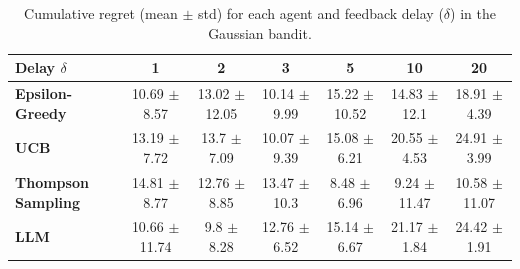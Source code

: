 \begin{table}[htbp]
\caption{Cumulative regret (mean $\pm$ std) for each agent and feedback delay ($\delta$) in the Gaussian bandit.}
\label{tab:gaussian_delays}
\begin{tabular}{lcccccc}
\toprule
Delay $\delta$ & 1 & 2 & 3 & 5 & 10 & 20 \\
\midrule
\textbf{Epsilon-Greedy} & 10.69 $\pm$ 8.57 & 13.02 $\pm$ 12.05 & 10.14 $\pm$ 9.99 & 15.22 $\pm$ 10.52 & 14.83 $\pm$ 12.1 & 18.91 $\pm$ 4.39 \\
\textbf{UCB} & 13.19 $\pm$ 7.72 & 13.7 $\pm$ 7.09 & 10.07 $\pm$ 9.39 & 15.08 $\pm$ 6.21 & 20.55 $\pm$ 4.53 & 24.91 $\pm$ 3.99 \\
\textbf{Thompson Sampling} & 14.81 $\pm$ 8.77 & 12.76 $\pm$ 8.85 & 13.47 $\pm$ 10.3 & 8.48 $\pm$ 6.96 & 9.24 $\pm$ 11.47 & 10.58 $\pm$ 11.07 \\
\textbf{LLM} & 10.66 $\pm$ 11.74 & 9.8 $\pm$ 8.28 & 12.76 $\pm$ 6.52 & 15.14 $\pm$ 6.67 & 21.17 $\pm$ 1.84 & 24.42 $\pm$ 1.91 \\
\bottomrule
\end{tabular}
\end{table}
